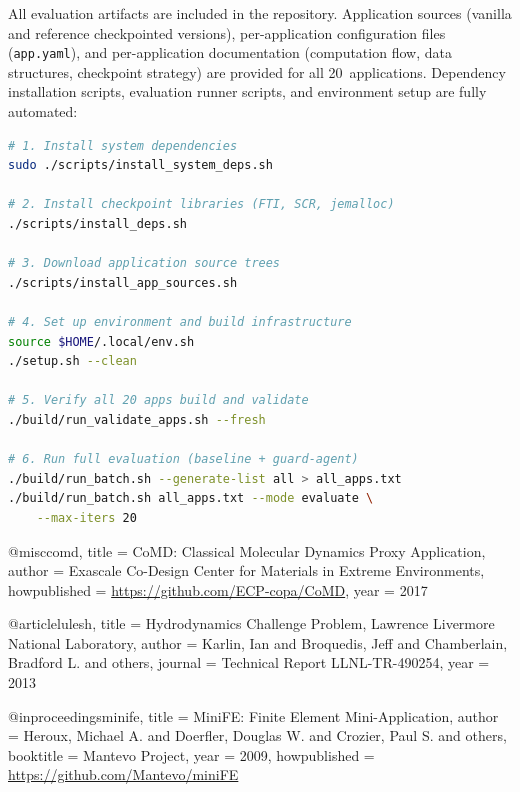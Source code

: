 All evaluation artifacts are included in the repository. Application sources (vanilla and reference checkpointed versions), per-application configuration files (\texttt{app.yaml}), and per-application documentation (computation flow, data structures, checkpoint strategy) are provided for all 20~applications. Dependency installation scripts, evaluation runner scripts, and environment setup are fully automated:

\begin{lstlisting}[language=bash,basicstyle=\small\ttfamily,frame=single,caption={Reproducing the full evaluation on a new system.},label={lst:reproduce}]
# 1. Install system dependencies
sudo ./scripts/install_system_deps.sh

# 2. Install checkpoint libraries (FTI, SCR, jemalloc)
./scripts/install_deps.sh

# 3. Download application source trees
./scripts/install_app_sources.sh

# 4. Set up environment and build infrastructure
source $HOME/.local/env.sh
./setup.sh --clean

# 5. Verify all 20 apps build and validate
./build/run_validate_apps.sh --fresh

# 6. Run full evaluation (baseline + guard-agent)
./build/run_batch.sh --generate-list all > all_apps.txt
./build/run_batch.sh all_apps.txt --mode evaluate \
    --max-iters 20
\end{lstlisting}

@misc{comd,
  title = {{CoMD}: Classical Molecular Dynamics Proxy Application},
  author = {{Exascale Co-Design Center for Materials in Extreme Environments}},
  howpublished = {\url{https://github.com/ECP-copa/CoMD}},
  year = {2017}
}

@article{lulesh,
  title = {Hydrodynamics Challenge Problem, {Lawrence Livermore National Laboratory}},
  author = {Karlin, Ian and Broquedis, Jeff and Chamberlain, Bradford L. and others},
  journal = {Technical Report LLNL-TR-490254},
  year = {2013}
}

@inproceedings{minife,
  title = {{MiniFE}: Finite Element Mini-Application},
  author = {Heroux, Michael A. and Doerfler, Douglas W. and Crozier, Paul S. and others},
  booktitle = {Mantevo Project},
  year = {2009},
  howpublished = {\url{https://github.com/Mantevo/miniFE}}
}

